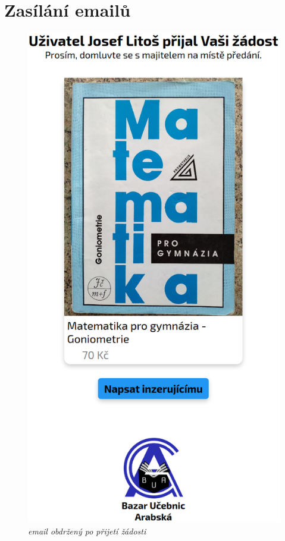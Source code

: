 \documentclass[a4paper,oneside,12pt]{report}
\begin{document}
\section{Zasílání emailů}\label{chap:/mails}
\begin{figure}
	\vspace{-4mm}
	\includegraphics{../img/mail.png}
	\caption{\textit{email obdržený po přijetí žádosti}}\label{fig:mail}
\end{figure}
\end{document}
